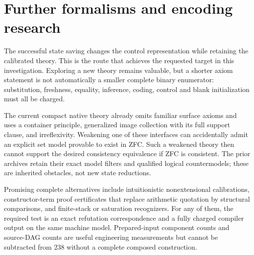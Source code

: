 \section{Further formalisms and encoding research}
The successful state saving changes the control representation while retaining the calibrated theory. This is the route that achieves the requested target in this investigation. Exploring a new theory remains valuable, but a shorter axiom statement is not automatically a smaller complete binary enumerator: substitution, freshness, equality, inference, coding, control and blank initialization must all be charged.

The current compact native theory already omits familiar surface axioms and uses a container principle, generalized image collection with its full support clause, and irreflexivity. Weakening one of these interfaces can accidentally admit an explicit set model provable to exist in ZFC. Such a weakened theory then cannot support the desired consistency equivalence if ZFC is consistent. The prior archives retain their exact model filters and qualified logical countermodels; these are inherited obstacles, not new state reductions.

Promising complete alternatives include intuitionistic nonextensional calibrations, constructor-term proof certificates that replace arithmetic quotation by structural comparisons, and finite-stack or saturation recognizers. For any of them, the required test is an exact refutation correspondence and a fully charged compiler output on the same machine model. Prepared-input component counts and source-DAG counts are useful engineering measurements but cannot be subtracted from 238 without a complete composed construction.


